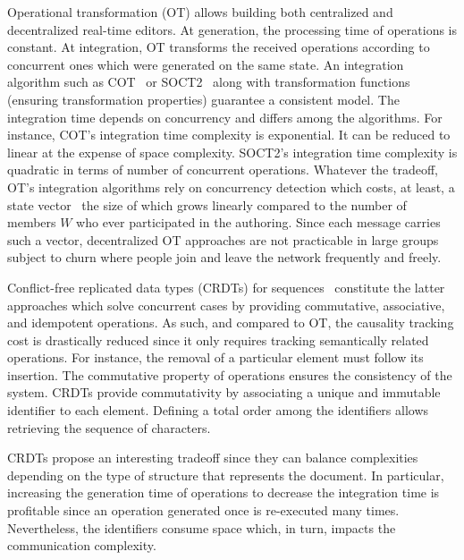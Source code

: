 Operational transformation (OT) allows building both centralized and
decentralized real-time editors. At generation, the processing time of
operations is constant. At integration, OT transforms the received operations
according to concurrent ones which were generated on the same state. An
integration algorithm such as COT~\cite{sun2009contextbased} or
SOCT2~\cite{vidot2000copies} along with transformation functions (ensuring
transformation properties) guarantee a consistent model. The integration time
depends on concurrency and differs among the algorithms.  For instance, COT's
integration time complexity is exponential. It can be reduced to linear at the
expense of space complexity. SOCT2's integration time complexity is quadratic in
terms of number of concurrent operations.  Whatever the tradeoff, OT's
integration algorithms rely on concurrency detection which costs, at least, a
state vector~\cite{charronbost1991concerning} the size of which grows linearly
compared to the number of members $W$ who ever participated in the
authoring. Since each message carries such a vector, decentralized OT approaches
are not practicable in large groups subject to churn where people join and leave
the network frequently and freely. %

Conflict-free replicated data types (CRDTs) for
sequences~\cite{shapiro2011comprehensive, shapiro2011conflict} constitute the
latter approaches which solve concurrent cases by providing commutative,
associative, and idempotent operations. As such, and compared to OT, the
causality tracking cost is drastically reduced since it only requires tracking
semantically related operations. For instance, the removal of a particular
element must follow its insertion. The commutative property of operations
ensures the consistency of the system. CRDTs provide commutativity by
associating a unique and immutable identifier to each element. Defining a total
order among the identifiers allows retrieving the sequence of characters.

\noindent CRDTs propose an interesting tradeoff since they can balance complexities
depending on the type of structure that represents the document.  In particular,
increasing the generation time of operations to decrease the integration time is
profitable since an operation generated once is re-executed many
times. Nevertheless, the identifiers consume space which, in turn, impacts the
communication complexity.

